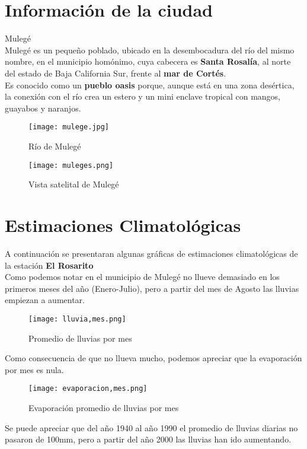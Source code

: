 \documentclass{article}
\begin{document}
\clearpage

\section{Información de la ciudad}
Mulegé \\
Mulegé es un pequeño poblado, ubicado en la desembocadura del río del mismo nombre, en el municipio homónimo, cuya cabecera es \textbf{Santa Rosalía}, al norte del estado de Baja California Sur, frente al \textbf{mar de Cortés}.\\
Es conocido como un \textbf{pueblo oasis} porque, aunque está en una zona desértica, la conexión con el río crea un estero y un mini enclave tropical con mangos, guayabos y naranjos.

\begin{figure}[H]
    \centering
    \texttt{[image: mulege.jpg]} 
    \caption{Río de Mulegé} 
\end{figure}   

\begin{figure}[H]
    \centering
    \texttt{[image: muleges.png]} 
    \caption{Vista satelital de Mulegé} 
\end{figure} 

\section{Estimaciones Climatológicas}
A continuación se presentaran algunas gráficas de estimaciones climatológicas de la estación \textbf{El Rosarito}\\

Como podemos notar en el municipio de Mulegé no llueve demasiado en los primeros meses del año (Enero-Julio), pero a partir del mes de Agosto las lluvias empiezan a aumentar. 

\begin{figure}[H]
    \centering
    \texttt{[image: lluvia,mes.png]} 
    \caption{Promedio de lluvias por mes} 
\end{figure} 

Como consecuencia de que no llueva mucho, podemos apreciar que la evaporación por mes es nula. 

\begin{figure}[H]
    \centering
    \texttt{[image: evaporacion,mes.png]} 
    \caption{Evaporación promedio de lluvias por mes} 
\end{figure} 

Se puede apreciar que del año 1940 al año 1990 el promedio de lluvias diarias no pasaron de 100mm, pero a partir del año 2000 las lluvias han ido aumentando.
\end{document}
